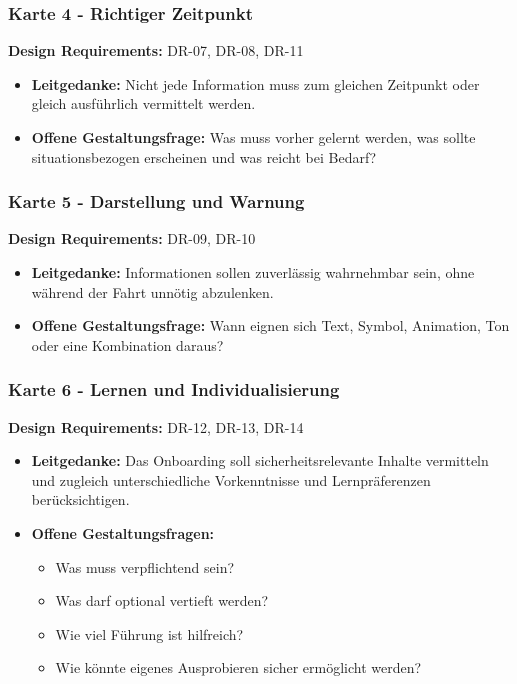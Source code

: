 \subsubsection*{Karte 4 - Richtiger Zeitpunkt}

\noindent
\textbf{Design Requirements:} DR-07, DR-08, DR-11

\begin{itemize}
    \item \textbf{Leitgedanke:}
    Nicht jede Information muss zum gleichen Zeitpunkt oder gleich
    ausführlich vermittelt werden.

    \item \textbf{Offene Gestaltungsfrage:}
    Was muss vorher gelernt werden, was sollte situationsbezogen
    erscheinen und was reicht bei Bedarf?
\end{itemize}

\subsubsection*{Karte 5 - Darstellung und Warnung}

\noindent
\textbf{Design Requirements:} DR-09, DR-10

\begin{itemize}
    \item \textbf{Leitgedanke:}
    Informationen sollen zuverlässig wahrnehmbar sein, ohne während der
    Fahrt unnötig abzulenken.

    \item \textbf{Offene Gestaltungsfrage:}
    Wann eignen sich Text, Symbol, Animation, Ton oder eine Kombination
    daraus?
\end{itemize}

\subsubsection*{Karte 6 - Lernen und Individualisierung}

\noindent
\textbf{Design Requirements:} DR-12, DR-13, DR-14

\begin{itemize}
    \item \textbf{Leitgedanke:}
    Das Onboarding soll sicherheitsrelevante Inhalte vermitteln und
    zugleich unterschiedliche Vorkenntnisse und Lernpräferenzen
    berücksichtigen.

    \item \textbf{Offene Gestaltungsfragen:}
    \begin{itemize}
        \item Was muss verpflichtend sein?
        \item Was darf optional vertieft werden?
        \item Wie viel Führung ist hilfreich?
        \item Wie könnte eigenes Ausprobieren sicher ermöglicht werden?
    \end{itemize}
\end{itemize}

